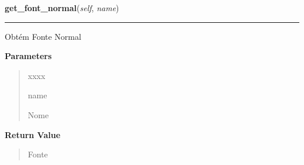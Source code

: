 \hspace{.8\funcindent}\begin{boxedminipage}{\funcwidth}

    \raggedright \textbf{get\_font\_normal}(\textit{self}, \textit{name})

    \vspace{-1.5ex}

    \rule{\textwidth}{0.5\fboxrule}
\setlength{\parskip}{2ex}
    Obtém Fonte Normal

\setlength{\parskip}{1ex}
      \textbf{Parameters}
      \vspace{-1ex}

      \begin{quote}
        \begin{Ventry}{xxxx}

          \item[name]

          Nome

        \end{Ventry}

      \end{quote}

      \textbf{Return Value}
    \vspace{-1ex}

      \begin{quote}
      Fonte

      \end{quote}

    \end{boxedminipage}

    \label{pygame-asteroids:resource_manager:ResourceManager:get_font_path}

    \vspace{0.5ex}


